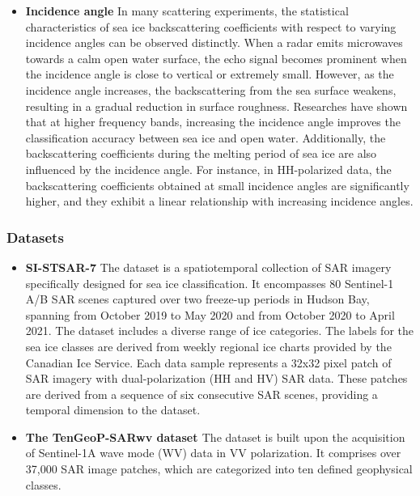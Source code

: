 \begin{itemize}
\item \textbf{Incidence angle} In many scattering experiments, the statistical characteristics of sea ice backscattering coefficients with respect to varying incidence angles can be observed distinctly. When a radar emits microwaves towards a calm open water surface, the echo signal becomes prominent when the incidence angle is close to vertical or extremely small. However, as the incidence angle increases, the backscattering from the sea surface weakens, resulting in a gradual reduction in surface roughness. Researches have shown that at higher frequency bands, increasing the incidence angle improves the classification accuracy between sea ice and open water. Additionally, the backscattering coefficients during the melting period of sea ice are also influenced by the incidence angle. For instance, in HH-polarized data, the backscattering coefficients obtained at small incidence angles are significantly higher, and they exhibit a linear relationship with increasing incidence angles.
\end{itemize}

\subsubsection {Datasets}

\begin{itemize}
\item \textbf{SI-STSAR-7\cite{143song2022si}} The dataset is a spatiotemporal collection of SAR imagery specifically designed for sea ice classification. It encompasses 80 Sentinel-1 A/B SAR scenes captured over two freeze-up periods in Hudson Bay, spanning from October 2019 to May 2020 and from October 2020 to April 2021. The dataset includes a diverse range of ice categories. The labels for the sea ice classes are derived from weekly regional ice charts provided by the Canadian Ice Service. Each data sample represents a 32x32 pixel patch of SAR imagery with dual-polarization (HH and HV) SAR data. These patches are derived from a sequence of six consecutive SAR scenes, providing a temporal dimension to the dataset.
\end{itemize}

\begin{itemize}
\item \textbf{The TenGeoP-SARwv dataset \cite{144wang2019labelled}} The dataset is built upon the acquisition of Sentinel-1A wave mode (WV) data in VV polarization. It comprises over 37,000 SAR image patches, which are categorized into ten defined geophysical classes.
\end{itemize}

